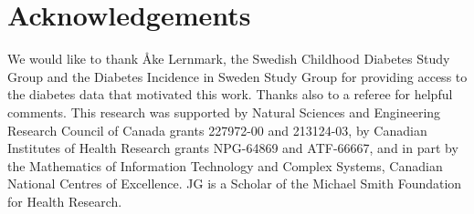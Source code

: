 \documentclass[article, shortnames]{jss}
\begin{document}
\section*{Acknowledgements}
We would like to thank {\AA}ke Lernmark,
the Swedish Childhood Diabetes Study Group and the
Diabetes Incidence in Sweden Study Group for
providing access to the diabetes data that motivated this work.
Thanks also to a referee for helpful comments.
This research was supported
by Natural Sciences and Engineering Research Council of Canada grants
227972-00 and 213124-03,
by Canadian Institutes of Health Research grants
NPG-64869 and ATF-66667, and in part by
the Mathematics of Information Technology and Complex Systems,
Canadian National Centres of Excellence.
JG is a Scholar of the Michael Smith Foundation for Health Research.


\nocite{*}
\end{document}

